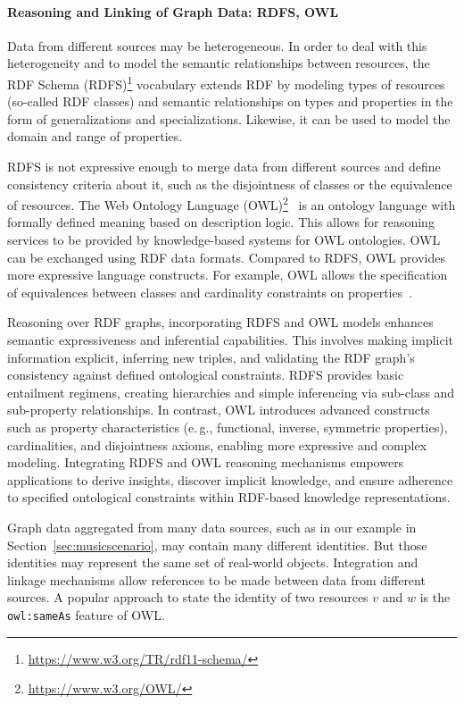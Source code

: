 \documentclass[a4paper,USenglish]{tgdk-v2021}
\newcommand{\myurl}[1]{\footnote{\url{#1}}}
\begin{document}
\paragraph*{Reasoning and Linking of Graph Data: RDFS, OWL}

Data from different sources may be heterogeneous. 
In order to deal with this heterogeneity and to model the semantic relationships between resources, the RDF Schema (RDFS)\myurl{https://www.w3.org/TR/rdf11-schema/} vocabulary extends RDF by modeling types of resources (so-called RDF classes) and semantic relationships on types and properties in the form of generalizations and specializations.
Likewise, it can be used to model the domain and range of properties.

RDFS is not expressive enough to merge data from different sources and define consistency criteria about it, such as the disjointness of classes or the equivalence of resources.
The Web Ontology Language (OWL)\myurl{https://www.w3.org/OWL/}~\cite{key:owl2} is an ontology language with formally defined meaning based on description logic.
This allows for reasoning services to be provided by knowledge-based systems for OWL ontologies. 
OWL can be exchanged using RDF data formats.
Compared to RDFS, OWL provides more expressive language constructs.
For example, OWL allows the specification of equivalences between classes and cardinality constraints on properties~\cite{key:owl2}.

Reasoning over RDF graphs, incorporating RDFS and OWL  models enhances semantic expressiveness and inferential capabilities. 
This involves making implicit information explicit, inferring new triples, and validating the RDF graph's consistency against defined ontological constraints. RDFS provides basic entailment regimens, creating hierarchies and simple inferencing via sub-class and sub-property relationships. In contrast, OWL introduces advanced constructs such as property characteristics (e.\,g., functional, inverse, symmetric properties), cardinalities, and disjointness axioms, enabling more expressive and complex modeling. Integrating RDFS and OWL reasoning mechanisms empowers applications to derive insights, discover implicit knowledge, and ensure adherence to specified ontological constraints within RDF-based knowledge representations. 

Graph data aggregated from many data sources, such as in our example in Section~\ref{sec:musicscenario}, may contain many different identities.
But those identities may represent the same set of real-world objects.
Integration and linkage mechanisms allow references to be made between data from different sources.
A popular approach to state the identity of two resources $v$ and $w$ is the \texttt{owl:sameAs} feature of OWL.
\end{document}
